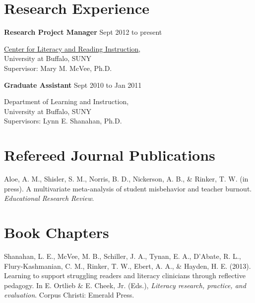 \section{Research Experience}

\textbf{Research Project Manager} \hfill {Sept 2012 to present}
\begin{innerlist}

\item[] \href{http://clari.buffalo.edu}{Center for Literacy and Reading Instruction},\\
        University at Buffalo, SUNY\\
        Supervisor: Mary M. McVee, Ph.D.
\end{innerlist}

\textbf{Graduate Assistant} \hfill {Sept 2010 to Jan 2011}
\begin{innerlist}

\item[] Department of Learning and Instruction,\\
        University at Buffalo, SUNY\\
        Supervisors: Lynn E. Shanahan, Ph.D.
\end{innerlist}

\section{Refereed Journal Publications}
\vspace{-.1275in}
\begin{bibsection}
    \item Aloe, A. M., Shisler, S. M., Norris, B. D., Nickerson, A. B., \& Rinker, T. W. (in press). A multivariate meta-analysis of student misbehavior and teacher burnout. \emph{Educational Research Review}.
\end{bibsection}
\halfblankline

\section{Book Chapters}
\vspace{-.1275in}
\begin{bibsection}
    \item Shanahan, L. E., McVee, M. B., Schiller, J. A., Tynan, E. A., D'Abate, R. L., Flury-Kashmanian, C. M., Rinker, T. W., Ebert, A. A., \& Hayden, H. E. (2013). Learning to support struggling readers and literacy clinicians through reflective pedagogy. In E. Ortlieb \& E. Cheek, Jr. (Eds.), \emph{Literacy research, practice, and evaluation}. Corpus Christi: Emerald Press.
\end{bibsection}

